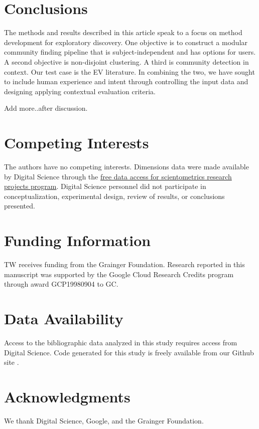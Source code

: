 \documentclass[12pt, oneside]{article}   	%
\begin{document}
\clearpage

\section{Conclusions} The methods and results described in this article speak to a focus on method development for exploratory discovery. One objective is to construct a modular community finding pipeline that is subject-independent and has options for users. A second objective is non-disjoint clustering. A third is community detection in context. Our test case is the EV literature. In combining the two, we have sought to include human experience and intent \citep{vonluxburg2012clustering} through controlling the input data and designing applying contextual evaluation criteria.

Add more..after discussion.


\section*{Competing Interests} \vspace{3mm} The authors have no competing interests. Dimensions data were made available by Digital Science through the \href{http://www.dimensions.ai/scientometric-research/.}{free data access for scientometrics research projects program}. Digital Science personnel did not participate in conceptualization, experimental design, review of results, or conclusions presented. 

\section*{Funding Information} TW receives funding from the Grainger Foundation. Research reported in this manuscript was supported by the Google Cloud Research Credits program through award GCP19980904 to GC.

\section*{Data Availability} Access to the bibliographic data analyzed in this study requires access from Digital Science. Code generated for this study is freely available from our Github site \citep{Park2021}.

\section*{Acknowledgments} We thank Digital Science, Google, and the Grainger Foundation.



\end{document}
